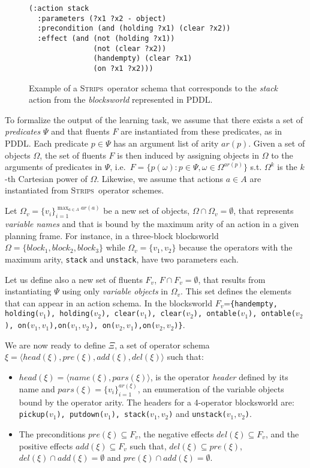 \documentclass[letterpaper]{article} %
\newcommand{\tup}[1]{{\langle #1 \rangle}}
\newcommand{\strips}{\textsc{Strips}}     %
\begin{document}
\begin{figure}
\begin{footnotesize}
\begin{verbatim}
(:action stack
  :parameters (?x1 ?x2 - object)
  :precondition (and (holding ?x1) (clear ?x2))
  :effect (and (not (holding ?x1)) 
               (not (clear ?x2))
               (handempty) (clear ?x1) 
               (on ?x1 ?x2)))
\end{verbatim}
\end{footnotesize}
 \caption{\small Example of a \strips\ operator schema that corresponds to the {\em stack} action from the {\em blocksworld} represented in PDDL.}
\label{fig:stack}
\end{figure}

To formalize the output of the learning task, we assume that there exists a set of {\em predicates} $\Psi$ and that fluents $F$ are instantiated from these predicates, as in PDDL. Each predicate $p\in\Psi$ has an argument list of arity $ar(p)$. Given a set of objects $\Omega$, the set of fluents $F$ is then induced by assigning objects in $\Omega$ to the arguments of predicates in $\Psi$, i.e.~$F=\{p(\omega):p\in\Psi,\omega\in\Omega^{ar(p)}\}$ s.t. $\Omega^k$ is the $k$-th Cartesian power of $\Omega$. Likewise, we assume that actions $a\in A$ are instantiated from \strips\ operator schemes. 

Let $\Omega_v=\{v_i\}_{i=1}^{\operatorname*{max}_{a\in A} ar(a)}$ be a new set of objects, $\Omega\cap\Omega_v=\emptyset$, that represents {\em variable names} and that is bound by the maximum arity of an action in a given planning frame. For instance, in a three-block blocksworld $\Omega=\{block_1, block_2, block_3\}$ while $\Omega_v=\{v_1, v_2\}$ because the operators with the maximum arity, {\small\tt stack} and {\small\tt unstack}, have two parameters each.

Let us define also a new set of fluents $F_{v}$, $F\cap F_v=\emptyset$, that results from instantiating $\Psi$ using only {\em variable objects} in $\Omega_v$. This set defines the elements that can appear in an action schema. In the blocksworld $F_v$={\small\tt\{handempty, holding($v_1$), holding($v_2$), clear($v_1$), clear($v_2$), ontable($v_1$), ontable($v_2$), on($v_1,v_1$),on($v_1,v_2$), on($v_2,v_1$),on($v_2,v_2$)\}}. 

We are now ready to define $\Xi$, a set of operator schema $\xi=\tup{head(\xi),pre(\xi),add(\xi),del(\xi)}$ such that:
\begin{itemize}
\item $head(\xi)=\tup{name(\xi),pars(\xi)}$, is the operator {\em header} defined by its name and $pars(\xi)=\{v_i\}_{i=1}^{ar(\xi)}$, an enumeration of the variable objects bound by the operator arity. The headers for a 4-operator blocksworld are: {\small\tt pickup($v_1$), putdown($v_1$), stack($v_1,v_2$)} and {\small\tt unstack($v_1,v_2$)}.
\item The preconditions $pre(\xi)\subseteq F_v$, the negative effects $del(\xi)\subseteq F_v$, and the positive effects $add(\xi)\subseteq F_v$ such that, $del(\xi)\subseteq pre(\xi)$, $del(\xi)\cap add(\xi)=\emptyset$ and $pre(\xi)\cap add(\xi)=\emptyset$.
\end{itemize}
\end{document}
